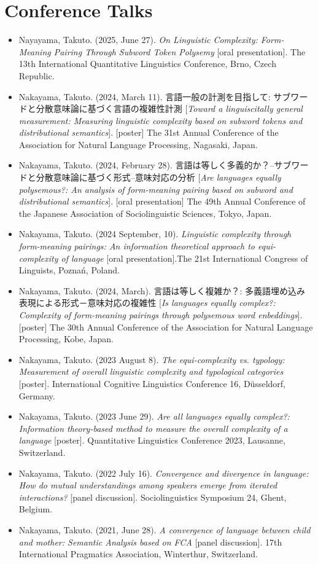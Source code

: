 \documentclass[a4paper,11pt]{article}
\begin{document}
\section*{Conference Talks}
\begin{itemize}[leftmargin=*, itemsep=0em, topsep=0em]
  \item Nayayama, Takuto. (2025, June 27). \textit{On Linguistic Complexity: Form-Meaning Pairing Through Subword Token Polysemy} [oral presentation]. The 13th International Quantitative Linguistics Conference, Brno, Czech Republic.
  \item Nakayama, Takuto. (2024, March 11). 言語一般の計測を目指して: サブワードと分散意味論に基づく言語の複雑性計測 [\textit{Toward a linguiscitally general measurement: Measuring linguistic complexity based on subword tokens and distributional semantics}]. [poster] The 31st Annual Conference of the Association for Natural Language Processing, Nagasaki, Japan.
  \item Nakayama, Takuto. (2024, February 28). 言語は等しく多義的か？–サブワードと分散意味論に基づく形式–意味対応の分析 [\textit{Are languages equally polysemous?: An analysis of form-meaning pairing based on subword and distributional semantics}]. [oral presentation] The 49th Annual Conference of the Japanese Association of Sociolinguistic Sciences, Tokyo, Japan.
  \item Nakayama, Takuto. (2024 September, 10). \textit{Linguistic complexity through form-meaning pairings: An information theoretical approach to equi-complexity of language} [oral presentation].The 21st International Congress of Linguists, Poznań, Poland.
  \item Nakayama, Takuto. (2024, March). 言語は等しく複雑か？: 多義語埋め込み表現による形式－意味対応の複雑性 [\textit{Is languages equally complex?: Complexity of form-meaning pairings through polysemous word enbeddings}]. [poster] The 30th Annual Conference of the Association for Natural Language Processing, Kobe, Japan.
  \item Nakayama, Takuto. (2023 August 8). \textit{The equi-complexity vs. typology: Measurement of overall linguistic complexity and typological categories} [poster]. International Cognitive Linguistics Conference 16, Düsseldorf, Germany.
  \item Nakayama, Takuto. (2023 June 29). \textit{Are all languages equally complex?: Information theory-based method to measure the overall complexity of a language} [poster]. Quantitative Linguistics Conference 2023, Lausanne, Switzerland.
  \item Nakayama, Takuto. (2022 July 16). \textit{Convergence and divergence in language: How do mutual understandings among speakers emerge from iterated interactions?} [panel discussion]. Sociolinguistics Symposium 24, Ghent, Belgium.
  \item Nakayama, Takuto. (2021, June 28). \textit{A convergence of language between child and mother: Semantic Analysis based on FCA} [panel discussion]. 17th International Pragmatics Association, Winterthur, Switzerland.
\end{itemize}
\end{document}
